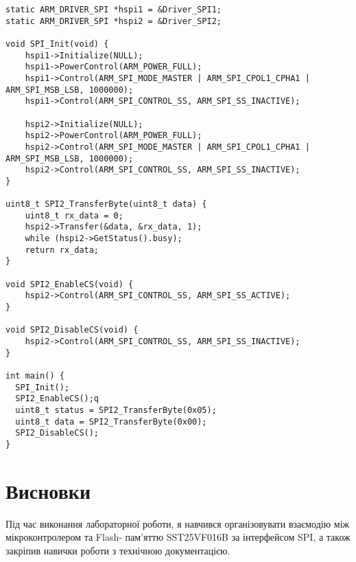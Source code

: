 \documentclass[oneside,14pt]{extarticle}
\begin{document}
\begin{normalsize}
{\begin{lstlisting}
static ARM_DRIVER_SPI *hspi1 = &Driver_SPI1;
static ARM_DRIVER_SPI *hspi2 = &Driver_SPI2;

void SPI_Init(void) {
    hspi1->Initialize(NULL);
    hspi1->PowerControl(ARM_POWER_FULL);
    hspi1->Control(ARM_SPI_MODE_MASTER | ARM_SPI_CPOL1_CPHA1 | ARM_SPI_MSB_LSB, 1000000);
    hspi1->Control(ARM_SPI_CONTROL_SS, ARM_SPI_SS_INACTIVE);

    hspi2->Initialize(NULL);
    hspi2->PowerControl(ARM_POWER_FULL);
    hspi2->Control(ARM_SPI_MODE_MASTER | ARM_SPI_CPOL1_CPHA1 | ARM_SPI_MSB_LSB, 1000000);
    hspi2->Control(ARM_SPI_CONTROL_SS, ARM_SPI_SS_INACTIVE);
}

uint8_t SPI2_TransferByte(uint8_t data) {
    uint8_t rx_data = 0;
    hspi2->Transfer(&data, &rx_data, 1);
    while (hspi2->GetStatus().busy);
    return rx_data;
}

void SPI2_EnableCS(void) {
    hspi2->Control(ARM_SPI_CONTROL_SS, ARM_SPI_SS_ACTIVE);
}

void SPI2_DisableCS(void) {
    hspi2->Control(ARM_SPI_CONTROL_SS, ARM_SPI_SS_INACTIVE);
}

int main() {
  SPI_Init();
  SPI2_EnableCS();q
  uint8_t status = SPI2_TransferByte(0x05);
  uint8_t data = SPI2_TransferByte(0x00);
  SPI2_DisableCS();
}\end{lstlisting}}
	
	\section*{Висновки}
	Під час виконання лабораторної роботи, я навчився організовувати взаємодію між мікроконтролером та Flash-
пам’яттю SST25VF016B за інтерфейсом SPI, а також закріпив навички роботи з
технічною документацією.
	    
\end{normalsize}
\end{document}

